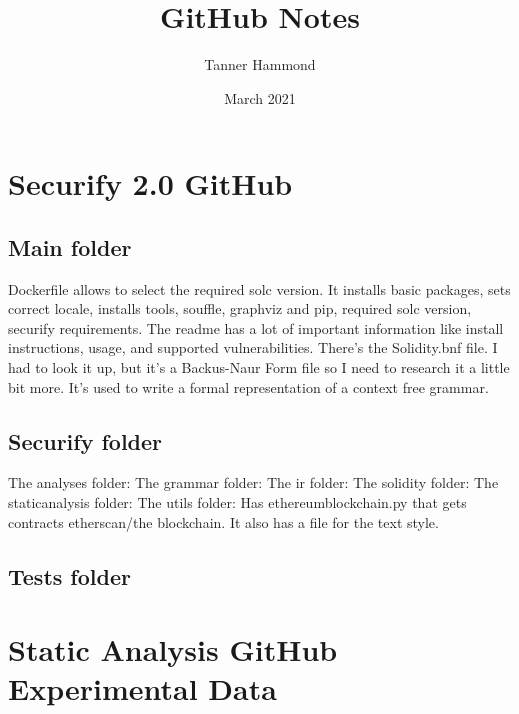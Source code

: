 \documentclass{article}
\title{GitHub Notes}
\author{Tanner Hammond}
\date{March 2021}
\begin{document}
\maketitle

\section{Securify 2.0 GitHub}

\subsection{Main folder}

Dockerfile allows to select the required solc version. It installs basic packages, sets correct locale, installs tools, souffle, graphviz and pip, required solc version, securify requirements. The readme has a lot of important information like install instructions, usage, and supported vulnerabilities. There's the Solidity.bnf file. I had to look it up, but it's a Backus-Naur Form file so I need to research it a little bit more. It's used to write a formal representation of a context free grammar.

\subsection{Securify folder}

The analyses folder: 
The grammar folder:
The ir folder:
The solidity folder:
The staticanalysis folder: 
The utils folder: Has ethereumblockchain.py that gets contracts etherscan/the blockchain. It also has a file for the text style.

\subsection{Tests folder}

\section{Static Analysis GitHub Experimental Data}
\end{document}
